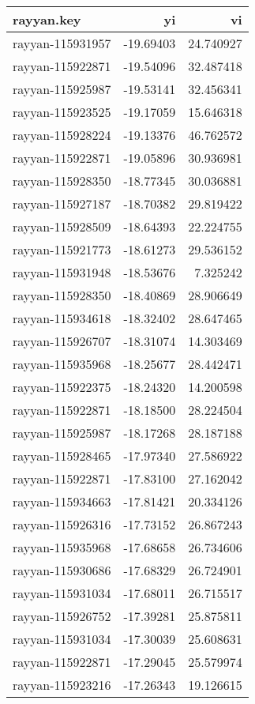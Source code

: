 \documentclass[
]{article}
\begin{document}
\begin{longtable}[]{@{}lrr@{}}
\toprule()
rayyan.key & yi & vi \\
\midrule()
\endhead
rayyan-115931957 & -19.69403 & 24.740927 \\
rayyan-115922871 & -19.54096 & 32.487418 \\
rayyan-115925987 & -19.53141 & 32.456341 \\
rayyan-115923525 & -19.17059 & 15.646318 \\
rayyan-115928224 & -19.13376 & 46.762572 \\
rayyan-115922871 & -19.05896 & 30.936981 \\
rayyan-115928350 & -18.77345 & 30.036881 \\
rayyan-115927187 & -18.70382 & 29.819422 \\
rayyan-115928509 & -18.64393 & 22.224755 \\
rayyan-115921773 & -18.61273 & 29.536152 \\
rayyan-115931948 & -18.53676 & 7.325242 \\
rayyan-115928350 & -18.40869 & 28.906649 \\
rayyan-115934618 & -18.32402 & 28.647465 \\
rayyan-115926707 & -18.31074 & 14.303469 \\
rayyan-115935968 & -18.25677 & 28.442471 \\
rayyan-115922375 & -18.24320 & 14.200598 \\
rayyan-115922871 & -18.18500 & 28.224504 \\
rayyan-115925987 & -18.17268 & 28.187188 \\
rayyan-115928465 & -17.97340 & 27.586922 \\
rayyan-115922871 & -17.83100 & 27.162042 \\
rayyan-115934663 & -17.81421 & 20.334126 \\
rayyan-115926316 & -17.73152 & 26.867243 \\
rayyan-115935968 & -17.68658 & 26.734606 \\
rayyan-115930686 & -17.68329 & 26.724901 \\
rayyan-115931034 & -17.68011 & 26.715517 \\
rayyan-115926752 & -17.39281 & 25.875811 \\
rayyan-115931034 & -17.30039 & 25.608631 \\
rayyan-115922871 & -17.29045 & 25.579974 \\
rayyan-115923216 & -17.26343 & 19.126615 \\

\end{longtable}
\end{document}
